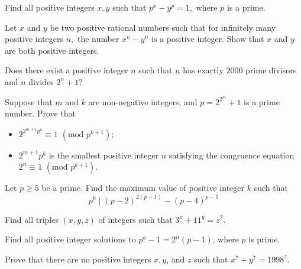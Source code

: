 \documentclass{subfile}
\begin{document}
	\begin{problem}
		Find all positive integers $x,y$ such that $p^x - y^p=1,$ where $p$ is a prime.
	\end{problem}



	\begin{problem}
		Let $x$ and $y$ be two positive rational numbers such that for infinitely many positive integers $n,$ the number $x^n-y^n$ is a positive integer. Show that $x$ and $y$ are both positive integers.
	\end{problem}

	\begin{problem}[IMO 2000]
		Does there exist a positive integer $n$ such that $n$ has exactly $2000$ prime divisors and $n$ divides $2^n + 1?$
	\end{problem}

	\begin{problem}
		Suppose that $m$ and $k$ are non-negative integers, and $p = 2^{2^m}+1$ is a prime number. Prove that
		\begin{itemize}
			\item $2^{2^{m+1}p^k} \equiv 1$ $(\text{mod } p^{k+1})$;
			\item $2^{m+1}p^k$ is the smallest positive integer $n$ satisfying the congruence equation $2^n \equiv 1$ $(\text{mod } p^{k+1})$.
		\end{itemize}
	\end{problem}

	\begin{problem}
		Let $p \geq 5$ be a prime. Find the maximum value of positive integer $k$ such that
		\[p^{k}\mid(p-2)^{2(p-1)}-(p-4)^{p-1}\]
	\end{problem}



	\begin{problem} %
		Find all triples $(x,y,z)$ of integers such that $3^x+11^y=z^2$.
	\end{problem}

	\begin{problem} %
		Find all positive integer solutions to $p^a-1=2^n(p-1)$, where $p$ is prime.
	\end{problem}

	\begin{problem} %
		Prove that there are no positive integers $x,y$, and $z$ such that $x^7+y^7=1998^z$.
	\end{problem}
\end{document}
